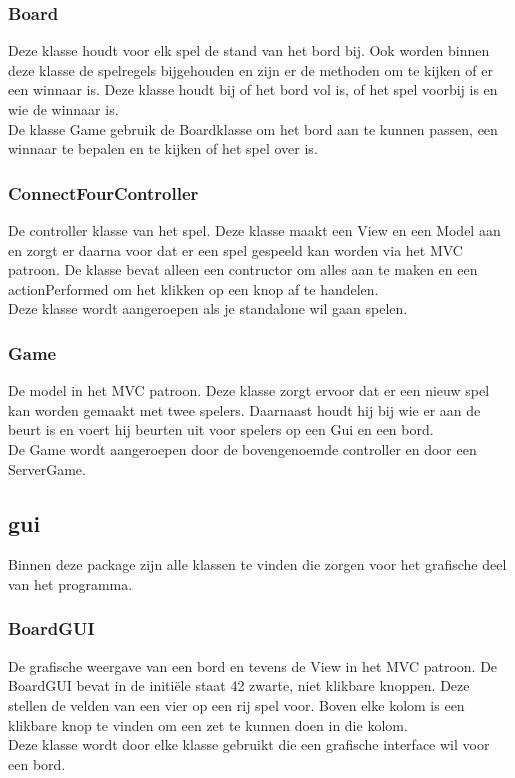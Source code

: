 \documentclass[12pt]{article}
\begin{document}
\subsubsection{Board}
Deze klasse houdt voor elk spel de stand van het bord bij. Ook worden binnen deze klasse de spelregels bijgehouden en zijn er de methoden om te kijken of er een winnaar is. Deze klasse houdt bij of het bord vol is, of het spel voorbij is en wie de winnaar is. \\
De klasse Game gebruik de Boardklasse om het bord aan te kunnen passen, een winnaar te bepalen en te kijken of het spel over is.

\subsubsection{ConnectFourController}
De controller klasse van het spel. Deze klasse maakt een View en een Model aan en zorgt er daarna voor dat er een spel gespeeld kan worden via het MVC patroon. De klasse bevat alleen een contructor om alles aan te maken en een actionPerformed om het klikken op een knop af te handelen.\\
Deze klasse wordt aangeroepen als je standalone wil gaan spelen.

\subsubsection{Game}
De model in het MVC patroon. Deze klasse zorgt ervoor dat er een nieuw spel kan worden gemaakt met twee spelers. Daarnaast houdt hij bij wie er aan de beurt is en voert hij beurten uit voor spelers op een Gui en een bord.\\
De Game wordt aangeroepen door de bovengenoemde controller en door een ServerGame. 

\subsection{gui}
Binnen deze package zijn alle klassen te vinden die zorgen voor het grafische deel van het programma.
\subsubsection{BoardGUI}
De grafische weergave van een bord en tevens de View in het MVC patroon. De BoardGUI bevat in de initi\"ele staat 42 zwarte, niet klikbare knoppen. Deze stellen de velden van een vier op een rij spel voor. Boven elke kolom is een klikbare knop te vinden om een zet te kunnen doen in die kolom.\\
Deze klasse wordt door elke klasse gebruikt die een grafische interface wil voor een bord. 
\end{document}

